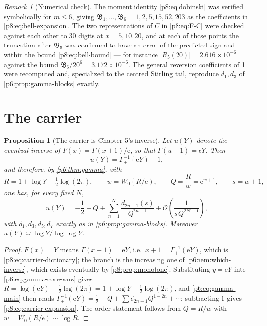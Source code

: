 \documentclass[11pt,a4paper,oneside]{book}
\theoremstyle{plain}
\newtheorem{proposition}[theorem]{Proposition}
\theoremstyle{definition}
\theoremstyle{remark}
\newtheorem{remark}[theorem]{Remark}
\newcommand{\e}{\mathrm{e}}
\newcommand{\bigO}{\mathcal{O}}
\newcommand{\Wlam}{W}
\begin{document}
\begin{remark}[Numerical check]\label{p8:rem:verification}
The moment identity \eqref{p8:eq:dobinski} was verified symbolically for
$m\le6$, giving $\mathfrak{B}_1,\dots,\mathfrak{B}_6=1,2,5,15,52,203$ as the coefficients in
\eqref{p8:eq:bell-expansion}.  The two representations of $C$ in
\eqref{p8:eq:F-C} were checked against each other to $30$ digits at
$x=5,10,20$, and at each of those points the truncation after $\mathfrak{B}_5$ was
confirmed to have an error of the predicted sign and within the bound
\eqref{p8:eq:bell-bound} --- for instance $|R_5(20)|=2.616\times10^{-6}$
against the bound $\mathfrak{B}_6/20^{6}=3.172\times10^{-6}$.  The general reversion
coefficients of \cref{p8:prop:carrier} were recomputed and, specialized to the
centred Stirling tail, reproduce $d_1,d_3$ of \cref{p6:prop:gamma-blocks}
exactly.
\end{remark}

\section{The carrier}
\label{p8:sec:carrier}

\begin{proposition}[The carrier is Chapter 5's inverse]\label{p8:prop:carrier}
Let $u(Y)$ denote the eventual inverse of $F(x)=\Gamma(x+1)/\e$, so that
$\Gamma(u+1)=\e Y$.  Then
\begin{equation}\label{p8:eq:carrier-dictionary}
 u(Y)=\Gamma_+^{-1}(\e Y)-1,
\end{equation}
and therefore, by \cref{p6:thm:gamma}, with
\begin{equation}\label{p8:eq:carrier-vars}
 R=1+\log Y-\tfrac12\log(2\pi),
 \qquad
 w=\Wlam_0(R/\e),
 \qquad
 Q=\frac Rw=\e^{w+1},
 \qquad
 s=w+1,
\end{equation}
one has, for every fixed $N$,
\begin{equation}\label{p8:eq:carrier-expansion}
 u(Y)=-\frac12+Q+\sum_{n=1}^{N}\frac{d_{2n-1}(s)}{Q^{2n-1}}
 +\bigO\!\left(\frac1{s\,Q^{2N+1}}\right),
\end{equation}
with $d_1,d_3,d_5,d_7$ exactly as in \cref{p6:prop:gamma-blocks}.  Moreover
$u(Y)\asymp\log Y/\log\log Y$.
\end{proposition}

\begin{proof}
$F(x)=Y$ means $\Gamma(x+1)=\e Y$, i.e.\ $x+1=\Gamma_+^{-1}(\e Y)$, which is
\eqref{p8:eq:carrier-dictionary}; the branch is the increasing one of
\cref{p6:rem:which-inverse}, which exists eventually by
\cref{p8:prop:monotone}.  Substituting $y=\e Y$ into
\eqref{p6:eq:gamma-core-vars} gives
$R=\log(\e Y)-\tfrac12\log(2\pi)=1+\log Y-\tfrac12\log(2\pi)$, and
\eqref{p6:eq:gamma-main} then reads
$\Gamma_+^{-1}(\e Y)=\tfrac12+Q+\sum d_{2n-1}Q^{1-2n}+\cdots$; subtracting $1$
gives \eqref{p8:eq:carrier-expansion}.  The order statement follows from
$Q=R/w$ with $w=\Wlam_0(R/\e)\sim\log R$.
\end{proof}
\end{document}
